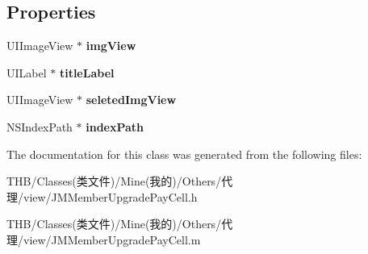 \subsection*{Properties}
\begin{DoxyCompactItemize}
\item 
\mbox{\label{interface_j_m_member_upgrade_pay_cell_a4bb56bf9c24312ca7dcc7a77ebd7cb53}} 
U\+I\+Image\+View $\ast$ {\bfseries img\+View}
\item 
\mbox{\label{interface_j_m_member_upgrade_pay_cell_ae6a37fc0bb45c33a9554546177366714}} 
U\+I\+Label $\ast$ {\bfseries title\+Label}
\item 
\mbox{\label{interface_j_m_member_upgrade_pay_cell_a88a420b68c9f2707431e537036e0cd36}} 
U\+I\+Image\+View $\ast$ {\bfseries seleted\+Img\+View}
\item 
\mbox{\label{interface_j_m_member_upgrade_pay_cell_a00de835143f8706d6aeb4e0f401eb096}} 
N\+S\+Index\+Path $\ast$ {\bfseries index\+Path}
\end{DoxyCompactItemize}


The documentation for this class was generated from the following files\+:\begin{DoxyCompactItemize}
\item 
T\+H\+B/\+Classes(类文件)/\+Mine(我的)/\+Others/代理/view/J\+M\+Member\+Upgrade\+Pay\+Cell.\+h\item 
T\+H\+B/\+Classes(类文件)/\+Mine(我的)/\+Others/代理/view/J\+M\+Member\+Upgrade\+Pay\+Cell.\+m\end{DoxyCompactItemize}
